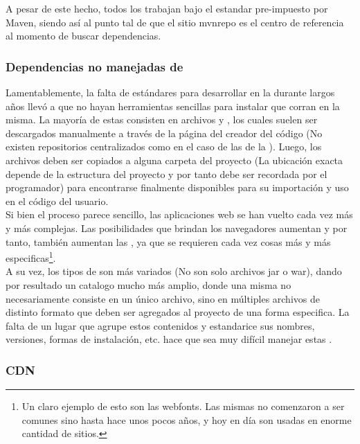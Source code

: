 A pesar de este hecho, todos los \depmgrs trabajan bajo el
estandar pre-impuesto por Maven, siendo así al punto tal de que el sitio
\gls{mvnrepo} es el centro de referencia al momento de buscar dependencias.

\subsubsection{Dependencias no manejadas de \viewtier}
\label{susubbsec:intro:jvm_dev:view_dependencies}

Lamentablemente, la falta de estándares para desarrollar \rias en la \viewtier 
durante largos años
llevó a que no hayan herramientas sencillas para instalar \dependencies que
corran en la misma. La mayoría de estas \dependencies consisten en archivos
\css y \js, los cuales suelen ser descargados manualmente a través de la
página del creador del código (No existen repositorios centralizados como
en el caso de las \dependencies de la \logictier). Luego, los archivos deben
ser copiados a alguna carpeta del proyecto (La ubicación exacta depende de
la estructura del proyecto y por tanto debe ser recordada por el programador)
para encontrarse finalmente disponibles para su importación y uso en el código
del usuario.\\
Si bien el proceso parece sencillo, las aplicaciones web se han vuelto cada
vez más y más complejas. Las posibilidades que brindan los navegadores aumentan
y por tanto, también aumentan las \dependencies, ya que se requieren cada vez
cosas más y más especificas\footnote{
	Un claro ejemplo de esto son las \gls{webfonts}. Las mismas
	no comenzaron a ser comunes sino hasta hace unos pocos años, y hoy en día
	son usadas en enorme cantidad de sitios.
}.\\
A su vez, los tipos de \dependency son más variados (No son solo archivos jar o war),
dando por resultado un catalogo mucho más amplio, donde una misma \dependency no
necesariamente consiste en un único archivo, sino en múltiples archivos de distinto
formato que deben ser agregados al proyecto de una forma especifica. La falta de un
lugar que agrupe
estos contenidos y estandarice sus nombres, versiones, formas de instalación, etc. hace que sea muy
difícil manejar estas \dependencies.

\subsubsection{CDN}
\label{susubbsec:intro:jvm_dev:cdns}

